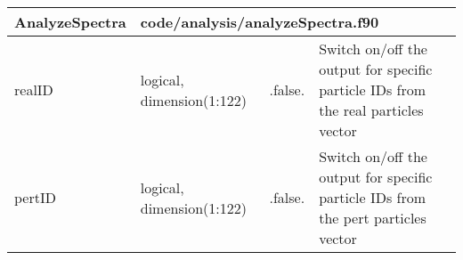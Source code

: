\documentclass{article}
\begin{document}

\begin{longtable}{llll}
\toprule
\textbf{\large{AnalyzeSpectra}} & \multicolumn{3}{l}{\footnotesize{code/analysis/analyzeSpectra.f90}}\\*
\midrule
\endfirsthead
\midrule
\endhead
realID & \begin{minipage}[t]{2cm}logical, dimension(1:122)\end{minipage} & \begin{minipage}[t]{2cm}.false.\end{minipage} & \begin{minipage}[t]{12cm}Switch on/off the output for specific particle IDs from the real particles vector\end{minipage}\\*
\midrule
pertID & \begin{minipage}[t]{2cm}logical, dimension(1:122)\end{minipage} & \begin{minipage}[t]{2cm}.false.\end{minipage} & \begin{minipage}[t]{12cm}Switch on/off the output for specific particle IDs from the pert particles vector\end{minipage}\\*
\bottomrule
\end{longtable}
{ }



\end{document}
